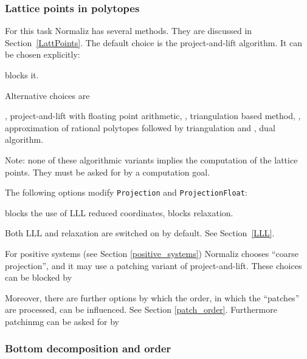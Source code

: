\subsubsection{Lattice points in polytopes}\label{approximate}

For this task Normaliz has several methods. They are discussed in Section~\ref{LattPoints}. The default choice is the project-and-lift algorithm. It can be chosen explicitly:
\begin{itemize}
	\itemtt[Projection, -j]
	
	\itemtt[NoProjection] blocks it.
\end{itemize}

Alternative choices are
\begin{itemize}
	\itemtt[ProjectionFloat, -J], project-and-lift with floating point arithmetic,
	\itemtt[PrimalMode, -P], triangulation based method,
	\itemtt [Approximate, -r], approximation of rational polytopes followed by triangulation and
	\itemtt[DualMode, -d], dual algorithm.
\end{itemize}
Note: none of these algorithmic variants implies the computation of the lattice points. They must be asked for by a computation goal.

The following options modify \verb|Projection| and \verb|ProjectionFloat|:
\begin{itemize}
	\itemtt[NoLLL] blocks the use of LLL reduced coordinates,
	\itemtt[NoRelax] blocks relaxation.
\end{itemize}
Both LLL and relaxation are switched on by default. See Section~\ref{LLL}.

For positive systems (see Section \ref{positive_systems}) Normaliz chooses  ``coarse projection'', and it may use a patching variant of project-and-lift. These choices can be blocked by
\begin{itemize}
	\itemtt[NoCoarseProjection]
	\itemtt[NoPatching]  
\end{itemize}
Moreover, there are further options by which the order, in which the ``patches'' are processed, can be influenced. See Section \ref{patch_order}. Furthermore patchinmg can be asked for by
\begin{itemize}
	\itemtt[Patching]  
\end{itemize}

\subsubsection{Bottom decomposition and order}

